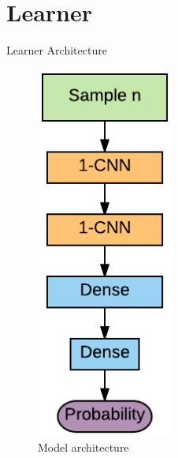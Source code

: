 \documentclass[notes]{beamer}
\begin{document}

\section{Learner}

\begin{frame}{Learner Architecture}
\begin{minipage}{0.45\textwidth}
	\begin{figure}
		\includegraphics[width=0.4\textwidth]{figures/cnn_sabater}
		\caption{Model architecture\cite{Sabater_2017}}
	\end{figure}
\end{minipage}
\begin{minipage}{0.45\textwidth}
	\begin{figure}

\end{figure}
\end{minipage}
\end{frame}
\end{document}
